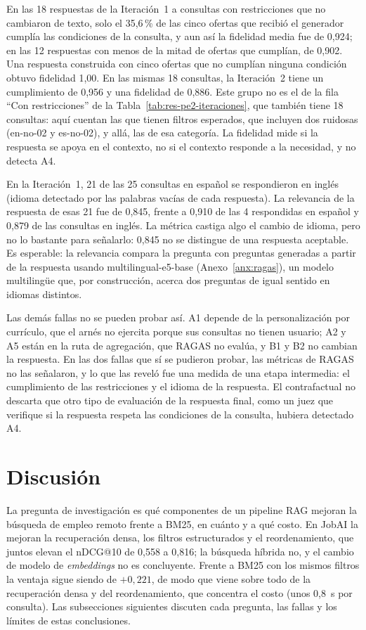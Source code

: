 En las 18 respuestas de la Iteración~1 a consultas con restricciones que no cambiaron de texto, solo el 35,6\,\% de las cinco ofertas que recibió el generador cumplía las condiciones de la consulta, y aun así la fidelidad media fue de 0,924; en las 12 respuestas con menos de la mitad de ofertas que cumplían, de 0,902. Una respuesta construida con cinco ofertas que no cumplían ninguna condición obtuvo fidelidad 1,00. En las mismas 18 consultas, la Iteración~2 tiene un cumplimiento de 0,956 y una fidelidad de 0,886. Este grupo no es el de la fila \enquote{Con restricciones} de la Tabla~\ref{tab:res-pe2-iteraciones}, que también tiene 18 consultas: aquí cuentan las que tienen filtros esperados, que incluyen dos ruidosas (en-no-02 y es-no-02), y allá, las de esa categoría. La fidelidad mide si la respuesta se apoya en el contexto, no si el contexto responde a la necesidad, y no detecta A4.

En la Iteración~1, 21 de las 25 consultas en español se respondieron en inglés (idioma detectado por las palabras vacías de cada respuesta). La relevancia de la respuesta de esas 21 fue de 0,845, frente a 0,910 de las 4 respondidas en español y 0,879 de las consultas en inglés. La métrica castiga algo el cambio de idioma, pero no lo bastante para señalarlo: 0,845 no se distingue de una respuesta aceptable. Es esperable: la relevancia compara la pregunta con preguntas generadas a partir de la respuesta usando multilingual-e5-base (Anexo~\ref{anx:ragas}), un modelo multilingüe que, por construcción, acerca dos preguntas de igual sentido en idiomas distintos.

Las demás fallas no se pueden probar así. A1 depende de la personalización por currículo, que el arnés no ejercita porque sus consultas no tienen usuario; A2 y A5 están en la ruta de agregación, que RAGAS no evalúa, y B1 y B2 no cambian la respuesta. En las dos fallas que sí se pudieron probar, las métricas de RAGAS no las señalaron, y lo que las reveló fue una medida de una etapa intermedia: el cumplimiento de las restricciones y el idioma de la respuesta. El contrafactual no descarta que otro tipo de evaluación de la respuesta final, como un juez que verifique si la respuesta respeta las condiciones de la consulta, hubiera detectado A4.

\section{Discusión}
\label{sec:res-discusion}

La pregunta de investigación es qué componentes de un pipeline RAG mejoran la búsqueda de empleo remoto frente a BM25, en cuánto y a qué costo. En JobAI la mejoran la recuperación densa, los filtros estructurados y el reordenamiento, que juntos elevan el nDCG@10 de 0,558 a 0,816; la búsqueda híbrida no, y el cambio de modelo de \textit{embeddings} no es concluyente. Frente a BM25 con los mismos filtros la ventaja sigue siendo de $+0{,}221$, de modo que viene sobre todo de la recuperación densa y del reordenamiento, que concentra el costo (unos 0,8~s por consulta). Las subsecciones siguientes discuten cada pregunta, las fallas y los límites de estas conclusiones.

